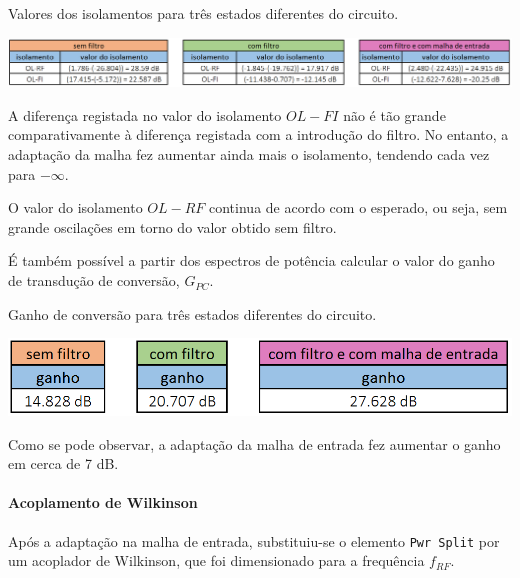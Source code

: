\documentclass[11pt]{article}
\numberwithin{equation}{section}
\begin{document}
\begin{table}[h]
	\centering
	\caption{Valores dos isolamentos para três estados diferentes do circuito.}
	\vspace{-1.5mm}
	\includegraphics[keepaspectratio=true, scale=0.40]{teoricas/isolamentosSemComFiltroMalha}
\end{table}

A diferença registada no valor do isolamento $OL - FI$ não é tão grande comparativamente à diferença registada com a introdução do filtro. No entanto, a adaptação da malha fez aumentar ainda mais o isolamento, tendendo cada vez para $- \infty$. 

O valor do isolamento $OL - RF$ continua de acordo com o esperado, ou seja, sem grande oscilações em torno do valor obtido sem filtro.

É também possível a partir dos espectros de potência calcular o valor do ganho de transdução de conversão, $G_{PC}$.

\begin{table}[h]
	\centering
	\caption{Ganho de conversão para três estados diferentes do circuito.}
	\vspace{-1.5mm}
	\includegraphics[keepaspectratio=true, scale=0.40]{teoricas/ganhoSemComFiltroMalha}
\end{table}

Como se pode observar, a adaptação da malha de entrada fez aumentar o ganho em cerca de 7 dB.

\paragraph{Acoplamento de Wilkinson} \hspace{0pt} 

Após a adaptação na malha de entrada, substituiu-se o elemento \texttt{Pwr Split} por um acoplador de Wilkinson, que foi dimensionado para a frequência $ f_{RF} $.

\pagebreak
\end{document}
